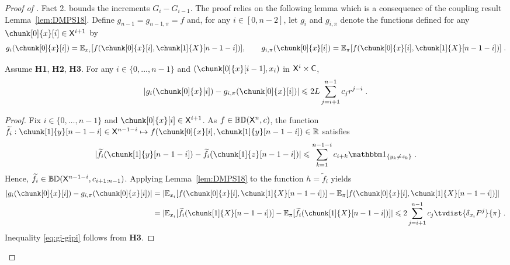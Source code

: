 \documentclass[leqno,11pt,a4paper]{article}
\begin{document}
\begin{proof}[Proof of ]
Fact 2. bounds the increments $G_i-G_{i-1}$. The proof relies on the following lemma which is a consequence of the coupling result Lemma~\ref{lem:DMPS18}.
Define $g_{n-1}=g_{n-1,\pi}=f$ and, for any $i\in [0,n-2]$, let $g_i$ and $g_{i,\pi}$ denote the functions defined for any $\chunk[0]{x}[i]\in\sX^{i+1}$ by 
\begin{equation}
\label{eq:definition-g-i}
g_i(\chunk[0]{x}[i])=\Ebb_{x_i}[f(\chunk[0]{x}[i],\chunk[1]{X}[n-1-i])],\qquad g_{i,\pi}(\chunk[0]{x}[i])=\Ebb_{\pi}[f(\chunk[0]{x}[i],\chunk[1]{X}[n-1-i])]\eqsp.
\end{equation}

\begin{lemma}
\label{lem:gi-gipi}
 Assume {\bf H1}, {\bf H2}, {\bf H3}. 
 For any $i\in \{0,\ldots,n-1\}$ and $(\chunk[0]{x}[i-1],x_i)$ in $\mathsf{X}^i\times\mathsf{C}$,
\begin{equation}\label{eq:gi-gipi}
|g_i(\chunk[0]{x}[i])-g_{i,\pi}(\chunk[0]{x}[i])|\leqslant 2L\sum_{j=i+1}^{n-1}c_jr^{j-i}\eqsp.
\end{equation}
\end{lemma}
\begin{proof}
 Fix $i\in\{0,\ldots,n-1\}$ and $\chunk[0]{x}[i]\in \sX^{i+1}$.
As $f\in\mathbb{BD}(\mathsf{X}^n,c)$, the function $\tilde{f}_i:\chunk[1]{y}[n-1-i]\in \sX^{n-1-i}\mapsto f(\chunk[0]{x}[i],\chunk[1]{y}[n-1-i])\in \R$ satisfies
\[
|\tilde{f}_i(\chunk[1]{y}[n-1-i])-\tilde{f}_i(\chunk[1]{z}[n-1-i])|\leqslant \sum_{k=1}^{n-1-i}c_{i+k}\indiacc{y_k\ne z_k}\eqsp.
\]
Hence, $\widetilde{f}_i\in\mathbb{B}\mathbb{D}(\mathsf{X}^{n-1-i},c_{i+1:n-1})$. Applying Lemma~\ref{lem:DMPS18} to the function $h=\tilde{f}_i$ yields
\begin{align*}
 |g_i(\chunk[0]{x}[i])-g_{i,\pi}(\chunk[0]{x}[i])|&=|\Ebb_{x_i}[f(\chunk[0]{x}[i],\chunk[1]{X}[n-1-i])]-\Ebb_{\pi}[f(\chunk[0]{x}[i],\chunk[1]{X}[n-1-i])]|\\
 &=|\Ebb_{x_i}[\tilde{f}_i(\chunk[1]{X}[n-1-i])]-\Ebb_{\pi}[\tilde{f}_i(\chunk[1]{X}[n-1-i])]| \leqslant 2\sum_{j=i+1}^{n-1}c_j \tvdist{\delta_{x_i}P^j}{\pi}\eqsp.
\end{align*}
Inequality \eqref{eq:gi-gipi} follows from {\bf H3}.
\end{proof}






\end{proof}
\end{document}
